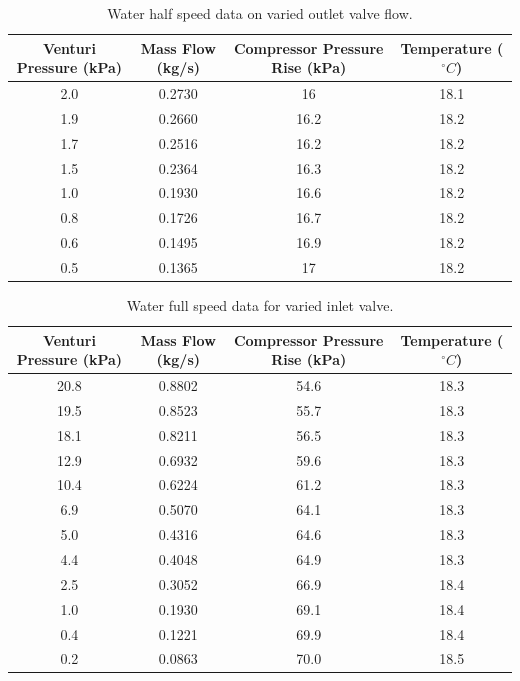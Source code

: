 \documentclass{article}
\begin{document}
\begin{table}[H]
    \centering
    \begin{tabular}{cccc}
        \hline
        Venturi Pressure (kPa) & Mass Flow (kg/s) & Compressor Pressure Rise (kPa) & Temperature ($^\circ C$)\\        \hline
        2.0 & 0.2730 & 16 & 18.1 \\
        1.9 & 0.2660 & 16.2 & 18.2 \\
        1.7 & 0.2516 & 16.2 & 18.2 \\
        1.5 & 0.2364 & 16.3 & 18.2 \\
        1.0 & 0.1930 & 16.6 & 18.2 \\
        0.8 & 0.1726 & 16.7 & 18.2 \\
        0.6 & 0.1495 & 16.9 & 18.2 \\
        0.5 & 0.1365 & 17 & 18.2 \\
        \hline
    \end{tabular}
    \caption{Water half speed data on varied outlet valve flow.}
    \label{tab:water_half_speed_outlet_data}
\end{table}

\begin{table}[H]
    \centering
    \begin{tabular}{cccc}
        \hline
        Venturi Pressure (kPa) & Mass Flow (kg/s) & Compressor Pressure Rise (kPa) & Temperature ($^\circ C$)\\        \hline
        20.8 & 0.8802 & 54.6 & 18.3 \\
        19.5 & 0.8523 & 55.7 & 18.3 \\
        18.1 & 0.8211 & 56.5 & 18.3 \\
        12.9 & 0.6932 & 59.6 & 18.3 \\
        10.4 & 0.6224 & 61.2 & 18.3 \\
        6.9 & 0.5070 & 64.1 & 18.3 \\
        5.0 & 0.4316 & 64.6 & 18.3 \\
        4.4 & 0.4048 & 64.9 & 18.3 \\
        2.5 & 0.3052 & 66.9 & 18.4 \\
        1.0 & 0.1930 & 69.1 & 18.4 \\
        0.4 & 0.1221 & 69.9 & 18.4 \\
        0.2 & 0.0863 & 70.0 & 18.5 \\
        \hline
    \end{tabular}
    \caption{Water full speed data for varied inlet valve.}
    \label{tab:water_full_speed_inlet_data}
\end{table}
\end{document}
